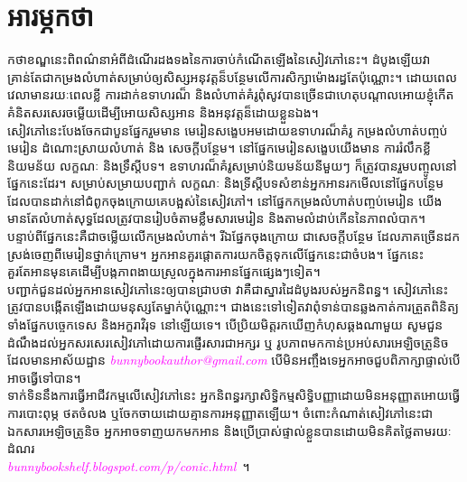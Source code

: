 \chapter*{អារម្ភកថា}
កថាខណ្ឌនេះពិពណ៌នាអំពីដំណើរដងទងនៃការចាប់កំណើតឡើងនៃសៀវភៅនេះ។ ដំបូងឡើយវាគ្រាន់តែជាកម្រងលំហាត់សម្រាប់ឲ្យសិស្សអនុវត្តន៏បន្ថែមលើការសិក្សាម៉ោងរដ្ធតែប៉ុណ្ណោះ។ ដោយពេលវេលាមានរយៈពេលខ្លី ការដាក់ឧទាហរណ៏ និងលំហាត់គំរូពុំសូវបានច្រើនជាហេតុបណ្ដាលអោយខ្ញុំកើតគំនិតសរសេរចម្លើយដើម្បីអោយសិស្សអាន និងអនុវត្តន៏ដោយខ្លួនឯង។
\\[1em]
សៀវភៅនេះបែងចែកជាបួនផ្នែករួមមាន មេរៀនសង្ខេបអមដោយឧទាហរណ៏គំរូ កម្រងលំហាត់បញ្ចប់មេរៀន ដំណោះស្រាយលំហាត់ និង សេចក្ដីបន្ថែម។ នៅផ្នែកមេរៀនសង្ខេបយើងមាន ការរំលឹកខ្លី និយមន័យ លក្ខណៈ និងទ្រឹស្ដីបទ។ ឧទាហរណ៏គំរូសម្រាប់និយមន័យនីមួយៗ ក៏ត្រូវបានរួមបញ្ចូលនៅផ្នែកនេះដែរ។ សម្រាប់សម្រាយបញ្ជាក់ លក្ខណៈ និងទ្រីស្ដីបទសំខាន់អ្នកអានរកមើលនៅផ្នែកបន្ថែមដែលបានដាក់នៅជំពូកចុងក្រោយគេបង្អស់នៃសៀវភៅ។ នៅផ្នែកកម្រងលំហាត់បញ្ចប់មេរៀន យើងមានតែលំហាត់សុទ្ធដែលត្រូវបានរៀបចំតាមខ្លឹមសារមេរៀន និងតាមលំដាប់កើននៃភាពលំបាក។ បន្ទាប់ពីផ្នែកនេះគឺជាចម្លើយលើកម្រងលំហាត់។ រីឯផ្នែកចុងក្រោយ ជាសេចក្ដីបន្ថែម ដែលភាគច្រើនដកស្រង់ចេញពីមេរៀនថ្នាក់ក្រោម។ អ្នកអានគួរផ្ដោតការយកចិត្តទុកលើផ្នែកនេះជាចំបង។ ផ្នែកនេះគួរតែអានមុនគេដើម្បីបង្កភាពងាយស្រួលក្នុងការអានផ្នែកផ្សេងៗទៀត។
\\[1em]
បញ្ជាក់ជួនដល់អ្នកអានសៀវភៅនេះឲ្យបានជ្រាបថា វាគឺជាស្នារដៃដំបូងរបស់អ្នកនិពន្ធ។ សៀវភៅនេះត្រូវបានបង្កើតឡើងដោយមនុស្សតែម្នាក់ប៉ុណ្ណោះ។ ជាងនេះទៅទៀតវាពុំទាន់បានឆ្លងកាត់ការត្រួតពិនិត្យទាំងផ្នែកបច្ចេកទេស និងអក្ខរាវិរុទ នៅឡើយទេ។ បើប្រិយមិត្តរកឃើញកំហុសឆ្គងណាមួយ សូមជួនដំណឹងដល់អ្នកសរសេរសៀវភៅដោយការផ្ញើរសារជាអក្សរ ឬ រូបភាពមកកាន់ប្រអប់សារអេឡិចត្រូនិច ដែលមានអាស័យដ្ឋាន \textcolor{magenta}{\itshape bunnybookauthor@gmail.com} បើមិនអញ្ចឹងទេអ្នកអាចជួបពិភាក្សាផ្ទាល់បើអាចធ្វើទៅបាន។
\\[1em]
ទាក់ទិននឹងការធ្វើអាជីវកម្មលើសៀវភៅនេះ អ្នកនិពន្ធរក្សាសិទ្ធិកម្មសិទ្ធិបញ្ញាដោយមិនអនុញ្ញាតអោយធ្វើការបោះពុម្ភ ថតចំលង ឬចែកចាយដោយគ្មានការអនុញ្ញាតឡើយ។ ចំពោះកំណាត់សៀវភៅនេះជាឯកសារអេឡិចត្រូនិច អ្នកអាចទាញយកមកអាន និងប្រើប្រាស់ផ្ទាល់ខ្លួនបានដោយមិនគិតថ្លៃតាមរយៈដំណរ\\ \textcolor{magenta}{\itshape bunnybookshelf.blogspot.com/p/conic.html}~។